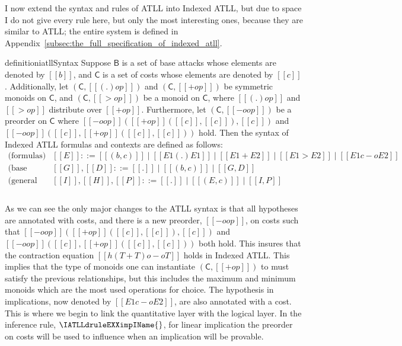 I now extend the syntax and rules of ATLL into Indexed ATLL, but due
to space I do not give every rule here, but only the most interesting
ones, because they are similar to ATLL; the entire system is defined
in Appendix~\ref{subsec:the_full_specification_of_indexed_atll}.
\begin{restatable}[]{definition}{iatllSyntax}
  \label{def:ATLL-syntax}
  Suppose $\mathsf{B}$ is a set of base attacks whose elements are
  denoted by $[[b]]$, and $\mathsf{C}$ is a set of costs whose
  elements are denoted by $[[c]]$.  Additionally, let
  $(\mathsf{C},[[(.)op]])$ and $(\mathsf{C},[[+op]])$ be symmetric
  monoids on $\mathsf{C}$, and $(\mathsf{C},[[>op]])$ be a monoid on
  $\mathsf{C}$, where $[[(.)op]]$ and $[[>op]]$ distribute over
  $[[+op]]$.  Furthermore, let $(\mathsf{C}, [[-oop]])$ be a preorder
  on $\mathsf{C}$ where $[[-oop]]([[+op]]([[c]],[[c]]),[[c]])$ and $[[-oop]]([[c]],[[+op]]([[c]],[[c]]))$ hold.  Then
  the syntax of Indexed ATLL formulas and contexts are defined as
  follows:
  \[
  \begin{array}{cll}
    \text{(formulas)}         & [[E]] ::= [[(b, c)]] \mid [[E1 (.) E1]] \mid [[E1 + E2]] \mid [[E1 > E2]] \mid [[E1 c -o E2]]\\
    \text{(base contexts)}    & [[G]],[[D]] ::= [[.]] \mid [[(b,c)]] \mid [[G,D]]\\
    \text{(general contexts)} & [[I]],[[H]],[[P]] ::= [[.]] \mid [[(E,c)]] \mid [[I,P]]\\\\
  \end{array}
  \]
\end{restatable}
\vspace{-10px} As we can see the only major changes to the ATLL syntax
is that all hypotheses are annotated with costs, and there is a new
preorder, $[[-oop]]$, on costs such that
$[[-oop]]([[+op]]([[c]],[[c]]),[[c]])$ and
$[[-oop]]([[c]],[[+op]]([[c]],[[c]]))$ both hold.  This insures that
the contraction equation $[[h(T + T) o-o T]]$ holds in Indexed ATLL.
This implies that the type of monoids one can instantiate
$(\mathsf{C},[[+op]])$ to must satisfy the previous relationships, but
this includes the maximum and minimum monoids which are the most used
operations for choice. The hypothesis in implications, now denoted by
$[[E1 c -o E2]]$, are also annotated with a cost.  This is where we
begin to link the quantitative layer with the logical layer.  In the
inference rule, $\IATLLdruleEXXimpIName{}$, for linear implication the
preorder on costs will be used to influence when an implication will
be provable.

